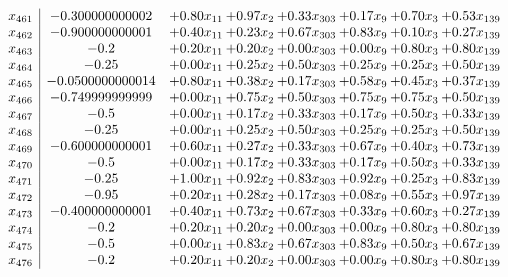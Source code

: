\documentclass[8pt]{article}
\begin{document}
\[\begin{array}{c| c c@{\hskip 2pt} c@{\hskip 2pt} c@{\hskip 2pt} c@{\hskip 2pt} c@{\hskip 2pt} c@{\hskip 2pt} }
 x_{461}   &  -0.300000000002 & +  0.80 x_{11} & +  0.97 x_{2} & +  0.33 x_{303} & +  0.17 x_{9} & +  0.70 x_{3} & +  0.53 x_{139}\\
 x_{462}   &  -0.900000000001 & +  0.40 x_{11} & +  0.23 x_{2} & +  0.67 x_{303} & +  0.83 x_{9} & +  0.10 x_{3} & +  0.27 x_{139}\\
 x_{463}   &  -0.2 & +  0.20 x_{11} & +  0.20 x_{2} & +  0.00 x_{303} & +  0.00 x_{9} & +  0.80 x_{3} & +  0.80 x_{139}\\
 x_{464}   &  -0.25 & +  0.00 x_{11} & +  0.25 x_{2} & +  0.50 x_{303} & +  0.25 x_{9} & +  0.25 x_{3} & +  0.50 x_{139}\\
 x_{465}   &  -0.0500000000014 & +  0.80 x_{11} & +  0.38 x_{2} & +  0.17 x_{303} & +  0.58 x_{9} & +  0.45 x_{3} & +  0.37 x_{139}\\
 x_{466}   &  -0.749999999999 & +  0.00 x_{11} & +  0.75 x_{2} & +  0.50 x_{303} & +  0.75 x_{9} & +  0.75 x_{3} & +  0.50 x_{139}\\
 x_{467}   &  -0.5 & +  0.00 x_{11} & +  0.17 x_{2} & +  0.33 x_{303} & +  0.17 x_{9} & +  0.50 x_{3} & +  0.33 x_{139}\\
 x_{468}   &  -0.25 & +  0.00 x_{11} & +  0.25 x_{2} & +  0.50 x_{303} & +  0.25 x_{9} & +  0.25 x_{3} & +  0.50 x_{139}\\
 x_{469}   &  -0.600000000001 & +  0.60 x_{11} & +  0.27 x_{2} & +  0.33 x_{303} & +  0.67 x_{9} & +  0.40 x_{3} & +  0.73 x_{139}\\
 x_{470}   &  -0.5 & +  0.00 x_{11} & +  0.17 x_{2} & +  0.33 x_{303} & +  0.17 x_{9} & +  0.50 x_{3} & +  0.33 x_{139}\\
 x_{471}   &  -0.25 & +  1.00 x_{11} & +  0.92 x_{2} & +  0.83 x_{303} & +  0.92 x_{9} & +  0.25 x_{3} & +  0.83 x_{139}\\
 x_{472}   &  -0.95 & +  0.20 x_{11} & +  0.28 x_{2} & +  0.17 x_{303} & +  0.08 x_{9} & +  0.55 x_{3} & +  0.97 x_{139}\\
 x_{473}   &  -0.400000000001 & +  0.40 x_{11} & +  0.73 x_{2} & +  0.67 x_{303} & +  0.33 x_{9} & +  0.60 x_{3} & +  0.27 x_{139}\\
 x_{474}   &  -0.2 & +  0.20 x_{11} & +  0.20 x_{2} & +  0.00 x_{303} & +  0.00 x_{9} & +  0.80 x_{3} & +  0.80 x_{139}\\
 x_{475}   &  -0.5 & +  0.00 x_{11} & +  0.83 x_{2} & +  0.67 x_{303} & +  0.83 x_{9} & +  0.50 x_{3} & +  0.67 x_{139}\\
 x_{476}   &  -0.2 & +  0.20 x_{11} & +  0.20 x_{2} & +  0.00 x_{303} & +  0.00 x_{9} & +  0.80 x_{3} & +  0.80 x_{139}\\

\end{array}\]
\end{document}
